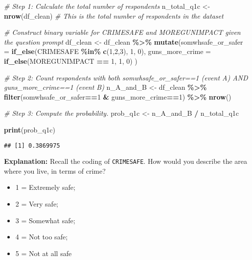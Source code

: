 \documentclass[
  11pt,
]{article}
\newenvironment{Shaded}{\begin{snugshade}}{\end{snugshade}}
\newcommand{\AttributeTok}[1]{\textcolor[rgb]{0.13,0.29,0.53}{#1}}
\newcommand{\CommentTok}[1]{\textcolor[rgb]{0.56,0.35,0.01}{\textit{#1}}}
\newcommand{\DecValTok}[1]{\textcolor[rgb]{0.00,0.00,0.81}{#1}}
\newcommand{\FunctionTok}[1]{\textcolor[rgb]{0.13,0.29,0.53}{\textbf{#1}}}
\newcommand{\NormalTok}[1]{#1}
\newcommand{\OtherTok}[1]{\textcolor[rgb]{0.56,0.35,0.01}{#1}}
\newcommand{\SpecialCharTok}[1]{\textcolor[rgb]{0.81,0.36,0.00}{\textbf{#1}}}
\providecommand{\tightlist}{%
  \setlength{\itemsep}{0pt}\setlength{\parskip}{0pt}}
\begin{document}
\begin{Shaded}
\begin{Highlighting}[]
\CommentTok{\# Step 1: Calculate the total number of respondents}
\NormalTok{n\_total\_q1c }\OtherTok{\textless{}{-}} \FunctionTok{nrow}\NormalTok{(df\_clean)  }\CommentTok{\# This is the total number of respondents in the dataset}


\CommentTok{\# Construct binary variable for CRIMESAFE and MOREGUNIMPACT given the question prompt}
\NormalTok{df\_clean }\OtherTok{\textless{}{-}}\NormalTok{ df\_clean }\SpecialCharTok{\%\textgreater{}\%}
  \FunctionTok{mutate}\NormalTok{(}\AttributeTok{somwhsafe\_or\_safer =} \FunctionTok{if\_else}\NormalTok{(CRIMESAFE }\SpecialCharTok{\%in\%} \FunctionTok{c}\NormalTok{(}\DecValTok{1}\NormalTok{,}\DecValTok{2}\NormalTok{,}\DecValTok{3}\NormalTok{), }\DecValTok{1}\NormalTok{, }\DecValTok{0}\NormalTok{),}
         \AttributeTok{guns\_more\_crime =} \FunctionTok{if\_else}\NormalTok{(MOREGUNIMPACT }\SpecialCharTok{==} \DecValTok{1}\NormalTok{, }\DecValTok{1}\NormalTok{, }\DecValTok{0}\NormalTok{) }
\NormalTok{         )}

\CommentTok{\# Step 2: Count respondents with both somwhsafe\_or\_safer==1 (event A) AND guns\_more\_crime==1 (event B)}
\NormalTok{n\_A\_and\_B }\OtherTok{\textless{}{-}}\NormalTok{ df\_clean }\SpecialCharTok{\%\textgreater{}\%}
  \FunctionTok{filter}\NormalTok{(somwhsafe\_or\_safer}\SpecialCharTok{==}\DecValTok{1} \SpecialCharTok{\&}\NormalTok{ guns\_more\_crime}\SpecialCharTok{==}\DecValTok{1}\NormalTok{) }\SpecialCharTok{\%\textgreater{}\%}
  \FunctionTok{nrow}\NormalTok{()}

\CommentTok{\# Step 3: Compute the probability.}
\NormalTok{prob\_q1c }\OtherTok{\textless{}{-}}\NormalTok{ n\_A\_and\_B }\SpecialCharTok{/}\NormalTok{ n\_total\_q1c}

\FunctionTok{print}\NormalTok{(prob\_q1c)}
\end{Highlighting}
\end{Shaded}

\begin{verbatim}
## [1] 0.3869975
\end{verbatim}

\textbf{Explanation:} Recall the coding of \texttt{CRIMESAFE}. How would
you describe the area where you live, in terms of crime?

\begin{itemize}
\tightlist
\item
  1 = Extremely safe;
\item
  2 = Very safe;
\item
  3 = Somewhat safe;
\item
  4 = Not too safe;
\item
  5 = Not at all safe
\end{itemize}
\end{document}
